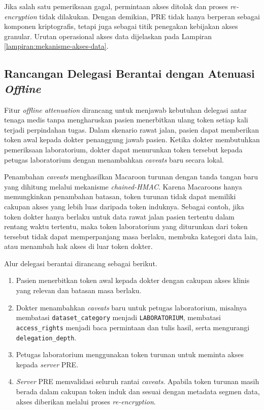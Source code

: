 Jika salah satu pemeriksaan gagal, permintaan akses ditolak dan proses \textit{re-encryption} tidak dilakukan. Dengan demikian, PRE tidak hanya berperan sebagai komponen kriptografis, tetapi juga sebagai titik penegakan kebijakan akses granular. Urutan operasional akses data dijelaskan pada Lampiran \ref{lampiran:mekanisme-akses-data}.

\subsection{Rancangan Delegasi Berantai dengan Atenuasi \textit{Offline}}
\label{subsec:rancangan-delegasi-offline}

Fitur \textit{offline attenuation} dirancang untuk menjawab kebutuhan delegasi antar tenaga medis tanpa mengharuskan pasien menerbitkan ulang token setiap kali terjadi perpindahan tugas. Dalam skenario rawat jalan, pasien dapat memberikan token awal kepada dokter penanggung jawab pasien. Ketika dokter membutuhkan pemeriksaan laboratorium, dokter dapat menurunkan token tersebut kepada petugas laboratorium dengan menambahkan \textit{caveats} baru secara lokal.

Penambahan \textit{caveats} menghasilkan Macaroon turunan dengan tanda tangan baru yang dihitung melalui mekanisme \textit{chained-HMAC}. Karena Macaroons hanya memungkinkan penambahan batasan, token turunan tidak dapat memiliki cakupan akses yang lebih luas daripada token induknya. Sebagai contoh, jika token dokter hanya berlaku untuk data rawat jalan pasien tertentu dalam rentang waktu tertentu, maka token laboratorium yang diturunkan dari token tersebut tidak dapat memperpanjang masa berlaku, membuka kategori data lain, atau menambah hak akses di luar token dokter.

Alur delegasi berantai dirancang sebagai berikut.

\begin{enumerate}[leftmargin=*]
	\item Pasien menerbitkan token awal kepada dokter dengan cakupan akses klinis yang relevan dan batasan masa berlaku.
	\item Dokter menambahkan \textit{caveats} baru untuk petugas laboratorium, misalnya membatasi \texttt{dataset\_category} menjadi \texttt{LABORATORIUM}, membatasi \texttt{access\_rights} menjadi baca permintaan dan tulis hasil, serta mengurangi \texttt{delegation\_depth}.
	\item Petugas laboratorium menggunakan token turunan untuk meminta akses kepada \textit{server} PRE.
	\item \textit{Server} PRE memvalidasi seluruh rantai \textit{caveats}. Apabila token turunan masih berada dalam cakupan token induk dan sesuai dengan metadata segmen data, akses diberikan melalui proses \textit{re-encryption}.
\end{enumerate}

